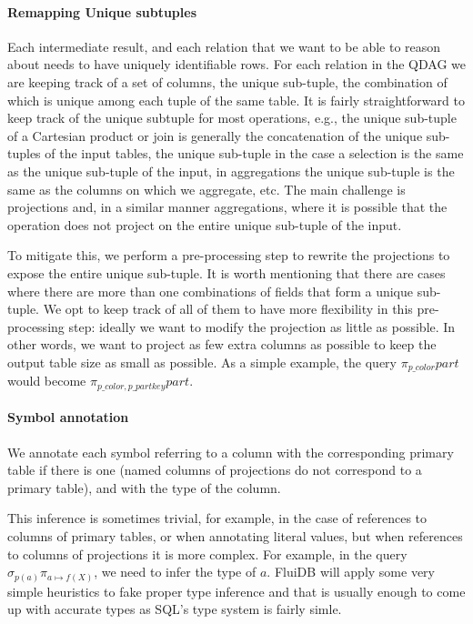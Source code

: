 \paragraph{Remapping Unique subtuples}

  Each intermediate result,
  and each relation that we want to be able to reason about needs to
  have uniquely identifiable rows. For each relation in the QDAG we
  are keeping track of a set of columns, the unique sub-tuple, the
  combination of which is unique among each tuple of the same
  table. It is fairly straightforward to keep track of the unique
  subtuple for most operations, e.g., the unique sub-tuple of a
  Cartesian product or join is generally the concatenation of the
  unique sub-tuples of the input tables, the unique sub-tuple in the
  case a selection is the same as the unique sub-tuple of the input,
  in aggregations the unique sub-tuple is the same as the columns on
  which we aggregate, etc. The main challenge is projections and, in a
  similar manner aggregations, where it is possible that the operation
  does not project on the entire unique sub-tuple of the input.

  To
  mitigate this, we perform a pre-processing step to rewrite the
projections to expose the entire unique sub-tuple. It is worth
  mentioning that there are cases where there are more than one
  combinations of fields that form a unique sub-tuple. We opt to keep
  track of all of them to have more flexibility in this
  pre-processing step: ideally we want to modify the projection as
  little as possible. In other words, we want to project as few extra
  columns as possible to keep the output table size as small as
  possible. As a simple example, the query
  \(\pi_{p\_color}\mathit{part}\) would become
  \(\pi_{p\_color,p\_partkey} \mathit{part}\).


\paragraph{Symbol annotation}

We annotate each symbol referring to a column with the
corresponding primary table if there is one (named columns of
projections do not correspond to a primary table), and with the type of the column.

This inference is sometimes trivial, for example, in the case
of references to columns of primary tables, or when annotating literal
values, but when references to columns of projections it is more
complex.  For example, in the query \(\sigma_{p(a)} \pi_{a \mapsto
f(X)}\), we need to infer the type of \(a\).  FluiDB will apply some
very simple heuristics to fake proper type inference and that is usually
enough to come up with accurate types as SQL's type system is fairly simle.

